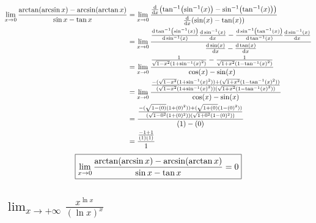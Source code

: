 \documentclass[]{article}
\begin{document}
\begin{align*}
    \lim_{x \to 0} \frac{\arctan(\arcsin{x}) - \arcsin(\arctan{x})}{\sin{x} - \tan{x}}
    &= \lim_{x \to 0}
        \frac{
            \dv{x} \qty(\tan[-1](\sin[-1](x)) - \sin[-1](\tan[-1](x)))
        }{
            \dv{x} \qty(\sin(x) - \tan(x))
        }\\
    &= \lim_{x \to 0}
        \frac{
            \dv{\tan[-1](\sin[-1](x))}{\sin[-1](x)} \dv{\sin[-1](x)}{x}
            - \dv{\sin[-1](\tan[-1](x))}{\tan[-1](x)}\dv{\sin[-1](x)}{x}
        }{
            \dv{\sin(x)}{x} - \dv{\tan(x)}{x}
        }\\
    &= \lim_{x \to 0}
        \frac{
            \frac{1}{\sqrt{1-x^2} (1 + \sin[-1](x)^2)} 
            - \frac{1}{\sqrt{1+x^2} (1 - \tan[-1](x)^2)}
        }{
            \cos(x) - \sin(x)
        }\\
    &= \lim_{x \to 0}
        \frac{
            \frac{
                - (\sqrt{1-x^2} (1 + \sin[-1](x)^2))
                + (\sqrt{1+x^2} (1 - \tan[-1](x)^2))
            }{
                (\sqrt{1-x^2} (1 + \sin[-1](x)^2))
                (\sqrt{1+x^2} (1 - \tan[-1](x)^2))
            }
        }{
            \cos(x) - \sin(x)
        }\\
    &= \frac{
            \frac{
                -(\sqrt{1 - (0)} (1 + (0)^2))
                +(\sqrt{1 + (0)} (1 - (0)^2))
            }{
                (\sqrt{1-0^2} (1 + (0)^2))
                (\sqrt{1+0^2} (1 - (0)^2))
            }
        }{
            (1) - (0)
        }\\
    &= \frac{
        \frac{
            -1 + 1
        }{
            (1)(1)
        }
    }{1}
\end{align*}
\begin{equation*}
    \centering
    \boxed{
        \lim_{x \to 0} \frac{\arctan(\arcsin{x}) - \arcsin(\arctan{x})}{\sin{x} - \tan{x}}
        = 0
    }
\end{equation*}

\subsection{
    $\lim_{x \to +\infty} \frac{x^{\ln{x}}}{(\ln{x})^x}$
}
\end{document}
